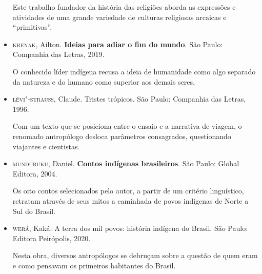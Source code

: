 \documentclass[12pt]{extarticle}
\begin{document}
\begin{itemize}
Este trabalho fundador da história das religiões aborda as expressões e
atividades de uma grande variedade de culturas religiosas arcaicas e
``primitivas''.

\item\textsc{krenak}, Ailton. \textbf{Ideias para adiar o fim do mundo}. São Paulo:
Companhia das Letras, 2019.

O conhecido líder indígena recusa a ideia de humanidade como algo
separado da natureza e do humano como superior aos demais seres.

\item\textsc{lévi"-strauss}, Claude. Tristes trópicos. São Paulo: Companhia das Letras, 1996.

Com um texto que se posiciona entre o ensaio e a narrativa de viagem, o
renomado antropólogo desloca parâmetros consagrados, questionando
viajantes e cientistas.


\item\textsc{munduruku}, Daniel. \textbf{Contos indígenas brasileiros}. São Paulo:
Global Editora, 2004.

Os oito contos selecionados pelo autor, a partir de um critério
linguístico, retratam através de seus mitos a caminhada de povos
indígenas de Norte a Sul do Brasil.


\item\textsc{werá}, Kaká. A terra dos mil povos: história indígena do Brasil. São
Paulo: Editora Peirópolis, 2020.

Nesta obra, diversos antropólogos se debruçam sobre a questão de quem
eram e como pensavam os primeiros habitantes do Brasil.
\end{itemize}
\end{document}
